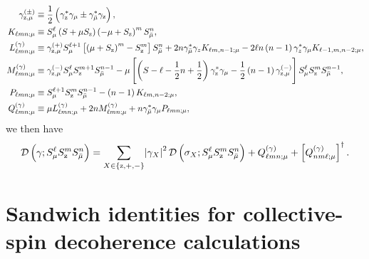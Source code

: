 \documentclass[aps,notitlepage,nofootinbib,11pt]{revtex4-1}
\newcommand{\f}[2]{\dfrac{#1}{#2}} %
\newcommand{\p}[1]{\left(#1\right)} %
\renewcommand{\sp}[1]{\left[#1\right]} %
\renewcommand{\set}[1]{\left\{#1\right\}} %
\newcommand{\D}{\mathcal{D}}
\newcommand{\z}{\text{z}}
\newcommand{\bmu}{{\bar\mu}}
\newcommand{\1}{\mathds{1}}
\begin{document}
\begin{align}
  \gamma_{\z,\mu}^{(\pm)}
  &\equiv \f12\p{\gamma_\z^* \gamma_\mu \pm \gamma_\bmu^* \gamma_\z},
  \allowdisplaybreaks \\
  K_{\ell mn;\mu}
  &\equiv S_\mu^\ell \p{S+\mu S_\z} \p{-\mu+S_\z}^m S_\bmu^n,
  \allowdisplaybreaks \\
  L_{\ell mn;\mu}^{(\gamma)}
  &\equiv \gamma_{\z,\mu}^{(+)} S_\mu^{\ell+1}
  \sp{\p{\mu+S_\z}^m-S_\z^m} S_\bmu^n
  + 2n \gamma_\bmu^* \gamma_z K_{\ell m,n-1;\mu}
  - 2\ell n\p{n-1} \gamma_z^* \gamma_\mu K_{\ell-1,m,n-2;\mu},
  \allowdisplaybreaks \\
  M_{\ell mn;\mu}^{(\gamma)}
  &\equiv \gamma_{\z,\mu}^{(-)} S_\mu^\ell
  S_\z^{m+1} S_\bmu^{n-1}
  -\mu \sp{\p{S-\ell-\f12n+\f12} \gamma_\z^* \gamma_\mu
    - \f12 \p{n-1} \gamma_{\z,\mu}^{(-)}}
  S_\mu^\ell S_\z^m S_\bmu^{n-1},
  \allowdisplaybreaks \\
  P_{\ell mn;\mu}
  &\equiv S_\mu^{\ell+1} S_\z^m S_\bmu^{n-1}
  - \p{n-1} K_{\ell m,n-2;\mu},
  \allowdisplaybreaks \\
  Q_{\ell mn;\mu}^{(\gamma)}
  &\equiv \mu L_{\ell mn;\mu}^{(\gamma)}
  + 2 n M_{\ell mn;\mu}^{(\gamma)}
  + n \gamma_\bmu^* \gamma_\mu P_{\ell mn;\mu},
\end{align}
we then have
\begin{align}
  \D\p{\gamma; S_\mu^\ell S_\z^m S_\bmu^n}
  = \sum_{X\in\set{\z,+,-}} \abs{\gamma_X}^2
  \D\p{\sigma_X; S_\mu^\ell S_\z^m S_\bmu^n}
  + Q_{\ell mn;\mu}^{(\gamma)} + \sp{Q_{nm\ell;\mu}^{(\gamma)}}^\dag.
\end{align}


\section{Sandwich identities for collective-spin decoherence
  calculations}
\label{sec:sandwich_collective}
\end{document}
